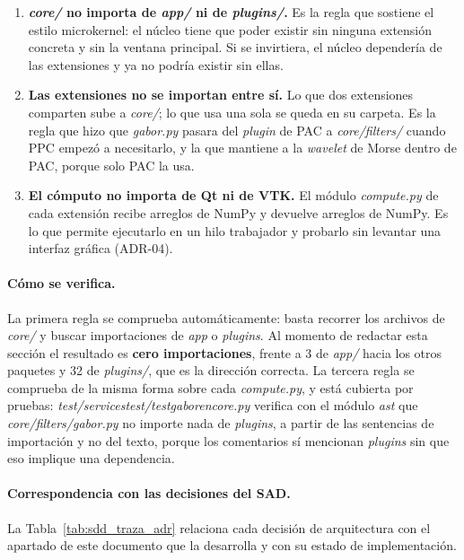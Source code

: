 \documentclass[12pt,letterpaper,oneside]{article}
\DeclareRobustCommand{\_}{\textunderscore\allowbreak}
\begin{document}
\begin{enumerate}
    \item \textbf{\textit{core/} no importa de \textit{app/} ni de \textit{plugins/}.} Es la regla que sostiene el estilo microkernel: el núcleo tiene que poder existir sin ninguna extensión concreta y sin la ventana principal. Si se invirtiera, el núcleo dependería de las extensiones y ya no podría existir sin ellas.
    \item \textbf{Las extensiones no se importan entre sí.} Lo que dos extensiones comparten sube a \textit{core/}; lo que usa una sola se queda en su carpeta. Es la regla que hizo que \textit{gabor.py} pasara del \textit{plugin} de PAC a \textit{core/filters/} cuando PPC empezó a necesitarlo, y la que mantiene a la \textit{wavelet} de Morse dentro de PAC, porque solo PAC la usa.
    \item \textbf{El cómputo no importa de Qt ni de VTK.} El módulo \textit{compute.py} de cada extensión recibe arreglos de NumPy y devuelve arreglos de NumPy. Es lo que permite ejecutarlo en un hilo trabajador y probarlo sin levantar una interfaz gráfica (ADR-04).
\end{enumerate}

\paragraph{Cómo se verifica.} La primera regla se comprueba automáticamente: basta recorrer los archivos de \textit{core/} y buscar importaciones de \textit{app} o \textit{plugins}. Al momento de redactar esta sección el resultado es \textbf{cero importaciones}, frente a 3 de \textit{app/} hacia los otros paquetes y 32 de \textit{plugins/}, que es la dirección correcta. La tercera regla se comprueba de la misma forma sobre cada \textit{compute.py}, y está cubierta por pruebas: \textit{test/services\_test/test\_gabor\_en\_core.py} verifica con el módulo \textit{ast} que \textit{core/filters/gabor.py} no importe nada de \textit{plugins}, a partir de las sentencias de importación y no del texto, porque los comentarios sí mencionan \textit{plugins} sin que eso implique una dependencia.

\paragraph{Correspondencia con las decisiones del SAD.} La Tabla~\ref{tab:sdd_traza_adr} relaciona cada decisión de arquitectura con el apartado de este documento que la desarrolla y con su estado de implementación.
\end{document}
